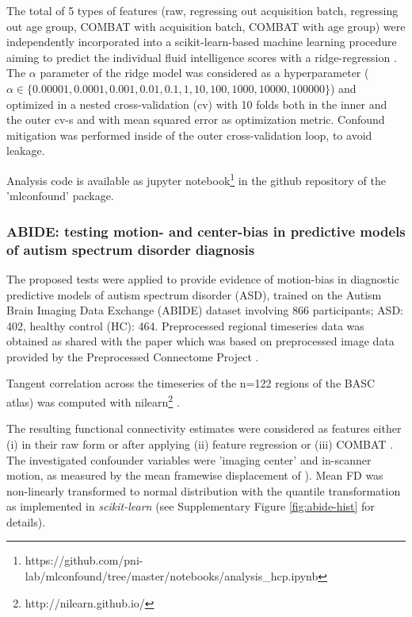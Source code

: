 \documentclass{article}
\begin{document}
The total of 5 types of features (raw, regressing out acquisition batch, regressing out age group, COMBAT with acquisition batch, COMBAT with age group) were independently incorporated into a scikit-learn-based \citep{pedregosa2011scikit} machine learning procedure aiming to predict the individual fluid intelligence scores with a ridge-regression \citep{hoerl1970ridge}. The $\alpha$ parameter of the ridge model was considered as a hyperparameter ($\alpha \in \{0.00001, 0.0001, 0.001, 0.01, 0.1, 1, 10, 100, 1000, 10000, 100000\}$) and optimized in a nested cross-validation (cv) with 10 folds both in the inner and the outer cv-s and with mean squared error as optimization metric. Confound mitigation was performed inside of the outer cross-validation loop, to avoid leakage.

Analysis code is available as jupyter notebook\footnote{https://github.com/pni-lab/mlconfound/tree/master/notebooks/analysis\_hcp.ipynb} in the github repository of the 'mlconfound' package.


\subsubsection*{ABIDE: testing motion- and center-bias in predictive models of autism spectrum disorder diagnosis}

The proposed tests were applied to provide evidence of motion-bias in diagnostic predictive models of autism spectrum disorder (ASD), trained on the Autism Brain Imaging Data Exchange (ABIDE) dataset \citep{di2014autism} involving 866 participants; ASD: 402, healthy control (HC): 464. Preprocessed regional timeseries data was obtained as shared with the paper \citep{dadi2019benchmarking} which was based on preprocessed image data provided by the Preprocessed Connectome Project \citep{craddock2013neuro}.

Tangent correlation across the timeseries of the n=122 regions of the BASC \citep{bellec2010multi} atlas) was computed with nilearn\footnote{http://nilearn.github.io/} \citep{huntenburg2017loading, esteve2015big}. 

The resulting functional connectivity estimates were considered as features either (i) in their raw form or after applying (ii) feature regression \citep{rao2017predictive} or (iii) COMBAT \citep{johnson2007adjusting, fortin2018harmonization}.
The investigated confounder variables were 'imaging center' and in-scanner motion, as measured by the mean framewise displacement of \cite{power2014methods}).
Mean FD was non-linearly transformed to normal distribution with the quantile transformation \citep{beasley2009rank} as implemented in \emph{scikit-learn} \citep{pedregosa2011scikit} (see Supplementary Figure \ref{fig:abide-hist} for details).
\end{document}

